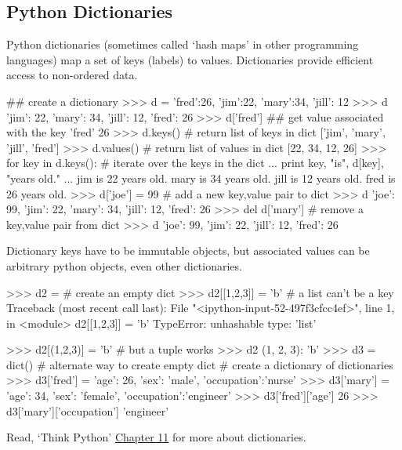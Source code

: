 \subsection{Python Dictionaries}

Python dictionaries (sometimes called `hash maps' in other programming languages) map a set of keys (labels) to values.  Dictionaries provide efficient access to non-ordered data.
%
\begin{python}
## create a dictionary
>>> d = {'fred':26, 'jim':22, 'mary':34, 'jill': 12}
>>> d
{'jim': 22, 'mary': 34, 'jill': 12, 'fred': 26}
>>> d['fred']  ## get value associated with the key 'fred'
26
>>> d.keys()  # return list of keys in dict
['jim', 'mary', 'jill', 'fred']
>>> d.values()  # return list of values in dict
[22, 34, 12, 26]
>>> for key in d.keys():    # iterate over the keys in the dict
...     print key, "is", d[key], "years old."
...     
jim is 22 years old.
mary is 34 years old.
jill is 12 years old.
fred is 26 years old.
>>> d['joe'] = 99  # add a new key,value pair to dict
>>> d
{'joe': 99, 'jim': 22, 'mary': 34, 'jill': 12, 'fred': 26}
>>> del d['mary']  # remove a key,value pair from dict
>>> d
{'joe': 99, 'jim': 22, 'jill': 12, 'fred': 26}
\end{python}

Dictionary keys have to be immutable objects, but associated values can be arbitrary python objects, even other dictionaries.
%
\begin{python}
>>> d2 = {}   # create an empty dict
>>> d2[[1,2,3]] = 'b'   # a list can't be a key
Traceback (most recent call last):
  File "<ipython-input-52-497f3cfcc4ef>", line 1, in <module>
    d2[[1,2,3]] = 'b'
TypeError: unhashable type: 'list'

>>> d2[(1,2,3)] = 'b'  # but a tuple works
>>> d2
{(1, 2, 3): 'b'}
>>> d3 = dict()  # alternate way to create empty dict
# create a dictionary of dictionaries
>>> d3['fred'] = {'age': 26, 'sex': 'male', 'occupation':'nurse'}
>>> d3['mary'] = {'age': 34, 'sex': 'female', 'occupation':'engineer'}
>>> d3['fred']['age']
26
>>> d3['mary']['occupation']
'engineer'
\end{python}

Read, `Think Python' \href{http://www.greenteapress.com/thinkpython/html/thinkpython012.html}{Chapter 11} for more about dictionaries.
